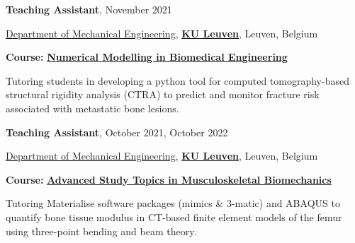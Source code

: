 \documentclass[8pt]{article}
\newcommand{\halfblankline}{\quad\vspace{-0.5\baselineskip}\pagebreak[3]}
\begin{document}
\textbf{Teaching Assistant}, {November 2021}
\begin{innerlist}
	\item[] \href{https://www.mech.kuleuven.be/en}{Department of Mechanical Engineering}, \href{https://www.kuleuven.be/english/kuleuven}{\textbf{KU Leuven}}, Leuven, Belgium
	\begin{innerlist}
		\item[] \textbf{Course:} \href{https://onderwijsaanbod.kuleuven.be//syllabi/e/H0N44AE.htm#activetab=doelstellingen_idp65744} {\textbf{Numerical Modelling in Biomedical Engineering}}
    \begin{innerlist}
      	  \item   Tutoring students in developing a python tool for computed tomography-based structural rigidity analysis (CTRA) to predict and monitor fracture risk associated with metastatic bone lesions. 
 
    \end{innerlist}

		
	\end{innerlist}
\end{innerlist}

\halfblankline



\textbf{Teaching Assistant}, {October 2021, October 2022}
\begin{innerlist}
	\item[] \href{https://www.mech.kuleuven.be/en}{Department of Mechanical Engineering}, \href{https://www.kuleuven.be/english/kuleuven}{\textbf{KU Leuven}}, Leuven, Belgium
	\begin{innerlist}
		\item[] \textbf{Course:} \href{https://onderwijsaanbod.kuleuven.be//syllabi/e/H06X2AE.htm#activetab=doelstellingen_idp59688} {\textbf{Advanced Study Topics in Musculoskeletal Biomechanics}}
    \begin{innerlist}
      	  \item   Tutoring Materialise software packages (mimics \& 3-matic) and ABAQUS to quantify bone tissue modulus in CT-based finite element models of the femur using three-point bending and beam theory. 
 
    \end{innerlist}
	
	\end{innerlist}
\end{innerlist}

\halfblankline
\end{document}
